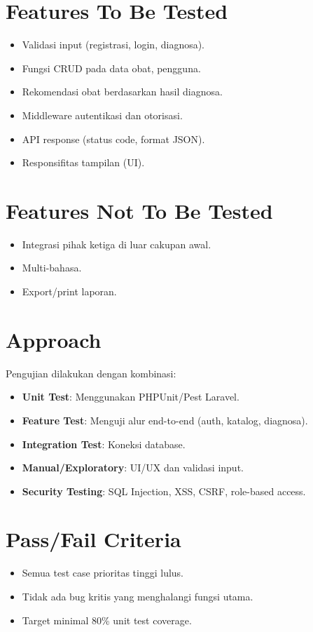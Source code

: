 \documentclass[12pt,a4paper]{article}
\begin{document}
\section{Features To Be Tested}
\begin{itemize}
    \item Validasi input (registrasi, login, diagnosa).
    \item Fungsi CRUD pada data obat, pengguna.
    \item Rekomendasi obat berdasarkan hasil diagnosa.
    \item Middleware autentikasi dan otorisasi.
    \item API response (status code, format JSON).
    \item Responsifitas tampilan (UI).
\end{itemize}

\section{Features Not To Be Tested}
\begin{itemize}
    \item Integrasi pihak ketiga di luar cakupan awal.
    \item Multi-bahasa.
    \item Export/print laporan.
\end{itemize}

\section{Approach}
Pengujian dilakukan dengan kombinasi:
\begin{itemize}
    \item \textbf{Unit Test}: Menggunakan PHPUnit/Pest Laravel.
    \item \textbf{Feature Test}: Menguji alur end-to-end (auth, katalog, diagnosa).
    \item \textbf{Integration Test}: Koneksi database.
    \item \textbf{Manual/Exploratory}: UI/UX dan validasi input.
    \item \textbf{Security Testing}: SQL Injection, XSS, CSRF, role-based access.
\end{itemize}

\section{Pass/Fail Criteria}
\begin{itemize}
    \item Semua test case prioritas tinggi lulus.
    \item Tidak ada bug kritis yang menghalangi fungsi utama.
    \item Target minimal 80\% unit test coverage.
\end{itemize}
\end{document}
